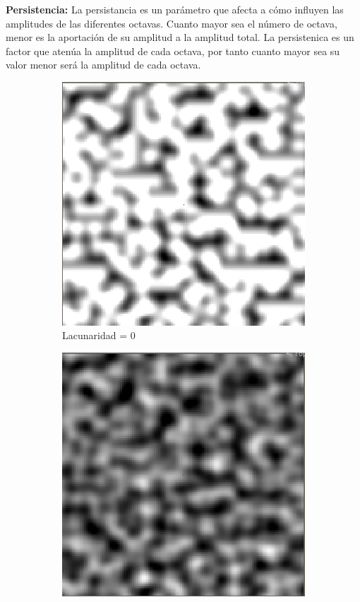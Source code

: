 \textbf{Persistencia: } La persistancia es un parámetro que afecta a cómo influyen las amplitudes de las diferentes octavas. Cuanto mayor sea el número de octava, menor es la aportación de su amplitud a la amplitud total. La persistenica es un factor que atenúa la amplitud de cada octava, por tanto cuanto mayor sea su valor menor será la amplitud de cada octava.
\begin{figure}[ht]
    \begin{subfigure}{0.3\linewidth}
        \centering
        \includegraphics[width=\linewidth]{img/LowPers.png}
        \caption{Lacunaridad = 0 }
    \end{subfigure}
    \hfill
    \begin{subfigure}{0.3\linewidth}
        \centering
        \includegraphics[width=\linewidth]{img/MediumPers.png}

\end{subfigure}
\end{figure}
